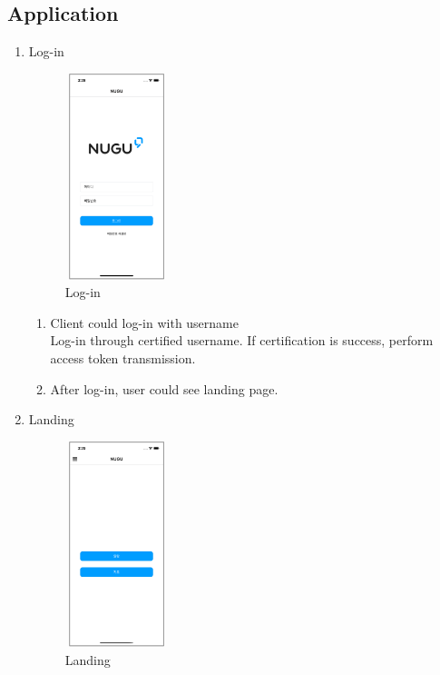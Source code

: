 \documentclass[conference]{IEEEtran}
\begin{document}
\begin{enumerate}
\begin{enumerate}
    \end{enumerate}
\end{enumerate}

\subsection{Application}
\begin{enumerate}
    \item Log-in
    \begin{figure}[htbp]
    \centerline{\includegraphics[width=3cm, height=6cm]{images/figure1.png}}
    \caption{Log-in}
    \end{figure}
    \begin{enumerate}
        \item Client could log-in with username\\
              Log-in through certified username. If certification is success, perform access token transmission.
        \item After log-in, user could see landing page.\\
    \end{enumerate}
    \item Landing
    \begin{figure}[htbp]
    \centerline{\includegraphics[width=3cm, height=6cm]{images/figure2.png}}
    \caption{Landing}
    \end{figure}

\end{enumerate}
\end{document}
